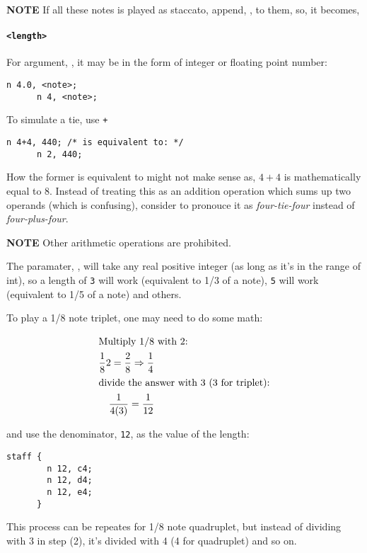 \textbf{NOTE} If all these notes is played as staccato, append,
, to them, so, it becomes, 

\paragraph{\texttt{<length>}} For argument, , it may be in the form of integer or floating point number:
\label{nlength}

\begin{Verbatim}[frame=single]
      n 4.0, <note>;
      n 4, <note>;
\end{Verbatim}

\np To simulate a tie, use \verb-+-

\begin{Verbatim}[frame=single]
      n 4+4, 440; /* is equivalent to: */
      n 2, 440; 
\end{Verbatim}

\np How the former is equivalent to  might
not make sense as, $4+4$ is mathematically equal to 8. Instead
of treating this as an addition operation which sums up two
operands (which is confusing), consider to pronouce it as
\textit{four-tie-four} instead of \textit{four-plus-four}.
 
\textbf{NOTE} Other arithmetic operations are prohibited.

\np The paramater, , will take any real positive integer (as long as it's in the range of int),
so a length of \verb+3+ will work (equivalent to 1/3 of a note), \verb+5+ will work (equivalent to 1/5
of a note) and others.

\np To play a 1/8 note triplet, one may need to do some math:

\begin{align}
	\shortintertext{Multiply 1/8 with 2:}
	\frac{1}{8}2 = \frac{2}{8} \Rightarrow \frac{1}{4} \\
	\shortintertext{divide the answer with 3 (3 for triplet):}
	\frac{1}{4(3)} = \frac{1}{12}
\end{align}

and use the denominator, \verb+12+, as the value of the length:
\begin{Verbatim}[frame=single]
      staff {
        n 12, c4;
        n 12, d4;
        n 12, e4;
      }
\end{Verbatim}

This process can be repeates for 1/8 note quadruplet, but instead of dividing
with 3 in step (2), it's divided with 4 (4 for quadruplet) and so on.


